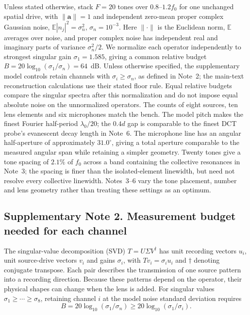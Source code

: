 \documentclass[pdflatex,sn-nature]{sn-jnl}%
\begin{document}
Unless stated otherwise, stack $F=20$ tones over $0.8$--$1.2f_0$ for one
unchanged spatial drive, with $\|\bm a\|=1$ and independent zero-mean proper
complex Gaussian noise, $\mathbb E|n_j|^2=\sigma_n^2$, $\sigma_n=10^{-3}$.
Here $\|\cdot\|$ is the Euclidean norm, $\mathbb E$ averages over noise,
and proper complex noise has independent real and imaginary parts of
variance $\sigma_n^2/2$. We normalize each operator independently to strongest singular gain $\sigma_1=1.585$, giving a common relative budget $B=20\log_{10}(\sigma_1/\sigma_n)=64$~dB. Unless otherwise specified, the supplementary model controls retain channels with $\sigma_i\ge\sigma_n$, as defined in Note~2; the main-text reconstruction calculations use their stated floor rule. Equal relative budgets compare the singular spectra after this normalization and do not impose equal absolute noise on the unnormalized operators.
The counts of eight sources, ten lens elements and six microphones match the bench. The model pitch makes the finest Fourier half-period $\lambda_0/20$; the $0.4d$ gap is comparable to the finest DCT probe's evanescent decay length in Note~6. The microphone line has an angular half-aperture of approximately $31.0^\circ$, giving a total aperture comparable to the measured angular span while retaining a simpler geometry. Twenty tones give a tone spacing of $2.1\%$ of $f_0$ across a band containing the collective resonances in Note~3; the spacing is finer than the isolated-element linewidth, but need not resolve every collective linewidth. Notes~3--6 vary the tone placement, number and lens geometry rather than treating these settings as an optimum.

\subsection*{Supplementary Note 2. Measurement budget needed for each channel}

The singular-value decomposition (SVD) $T=U\Sigma V^\dagger$ has unit
recording vectors $u_i$, unit source-drive vectors $v_i$ and gains
$\sigma_i$, with $Tv_i=\sigma_i u_i$ and $\dagger$ denoting conjugate transpose.
Each pair describes the transmission of one source pattern into a recording direction. Because these patterns depend on the operator, their physical shapes can change when the lens is added. For singular values
$\sigma_1\ge\cdots\ge\sigma_8$, retaining channel $i$
at the model noise standard deviation requires
\begin{equation}
 B=20\log_{10}(\sigma_1/\sigma_n)
 \ge20\log_{10}(\sigma_1/\sigma_i).
 \label{eq:drladder}
\end{equation}
\end{document}
